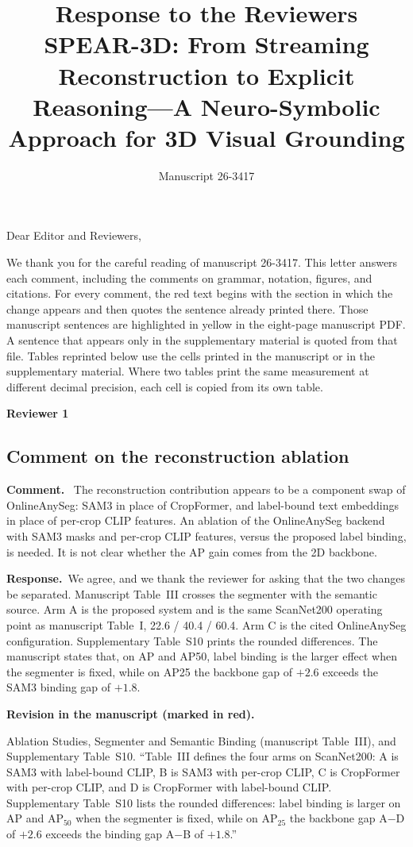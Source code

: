\documentclass[11pt]{article}
\title{\textbf{Response to the Reviewers}\\[0.4em]
\large SPEAR-3D: From Streaming Reconstruction to Explicit Reasoning---A Neuro-Symbolic Approach for 3D Visual Grounding}
\author{}
\date{Manuscript 26-3417}
\newcommand{\revcomment}[1]{%
  \par\vspace{0.6em}\noindent\textcolor{revblue}{\textbf{Comment.}}\ %
  \textcolor{revblue}{#1}\par\vspace{0.4em}}
\newcommand{\revresponse}[1]{%
  \par\noindent\textbf{Response.}\ #1\par\vspace{0.3em}}
\newcommand{\revchange}[1]{%
  \par\noindent\textbf{Revision in the manuscript (marked in red).}\par
  \noindent\textcolor{revred}{#1}\par\vspace{0.8em}}
\begin{document}
\maketitle
\thispagestyle{empty}

\noindent Dear Editor and Reviewers,

\medskip
\noindent We thank you for the careful reading of manuscript 26-3417. This letter answers each comment, including the comments on grammar, notation, figures, and citations. For every comment, the red text begins with the section in which the change appears and then quotes the sentence already printed there. Those manuscript sentences are highlighted in yellow in the eight-page manuscript PDF. A sentence that appears only in the supplementary material is quoted from that file. Tables reprinted below use the cells printed in the manuscript or in the supplementary material. Where two tables print the same measurement at different decimal precision, each cell is copied from its own table.

\bigskip
\noindent\textcolor{revblue}{\large\textbf{Reviewer 1}}

\subsection*{Comment on the reconstruction ablation}

\revcomment{The reconstruction contribution appears to be a component swap of OnlineAnySeg: SAM3 in place of CropFormer, and label-bound text embeddings in place of per-crop CLIP features. An ablation of the OnlineAnySeg backend with SAM3 masks and per-crop CLIP features, versus the proposed label binding, is needed. It is not clear whether the AP gain comes from the 2D backbone.}

\revresponse{We agree, and we thank the reviewer for asking that the two changes be separated. Manuscript Table~III crosses the segmenter with the semantic source. Arm A is the proposed system and is the same ScanNet200 operating point as manuscript Table~I, 22.6 / 40.4 / 60.4. Arm C is the cited OnlineAnySeg configuration. Supplementary Table~S10 prints the rounded differences. The manuscript states that, on AP and AP50, label binding is the larger effect when the segmenter is fixed, while on AP25 the backbone gap of \(+2.6\) exceeds the SAM3 binding gap of \(+1.8\).}

\revchange{Ablation Studies, Segmenter and Semantic Binding (manuscript Table~III), and Supplementary Table~S10. ``Table~III defines the four arms on ScanNet200: A is SAM3 with label-bound CLIP, B is SAM3 with per-crop CLIP, C is CropFormer with per-crop CLIP, and D is CropFormer with label-bound CLIP. Supplementary Table~S10 lists the rounded differences: label binding is larger on AP and AP\(_{50}\) when the segmenter is fixed, while on AP\(_{25}\) the backbone gap A\(-\)D of \(+2.6\) exceeds the binding gap A\(-\)B of \(+1.8\).''}
\end{document}
